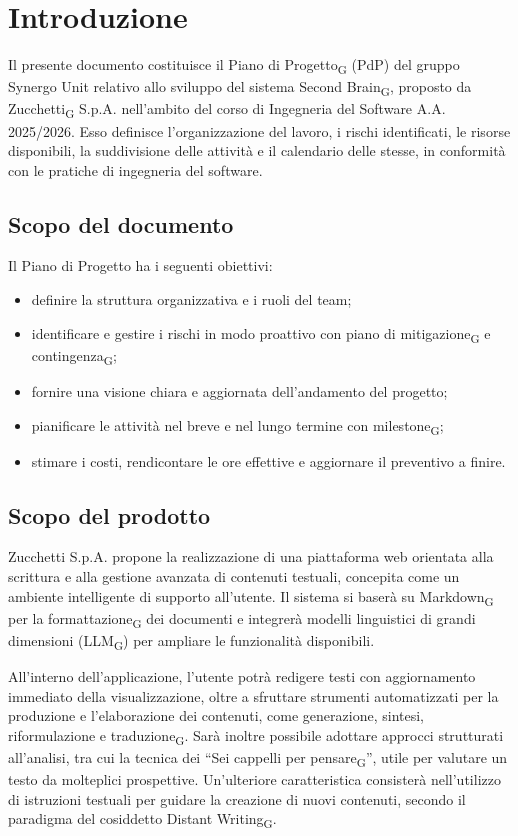 \section{Introduzione}
Il presente documento costituisce il Piano di Progetto\textsubscript{G} (PdP) del gruppo Synergo Unit relativo allo sviluppo del sistema Second Brain\textsubscript{G}, proposto da Zucchetti\textsubscript{G} S.p.A. nell'ambito del corso di Ingegneria del Software A.A. 2025/2026. Esso definisce l'organizzazione del lavoro, i rischi identificati, le risorse disponibili, la suddivisione delle attività e il calendario delle stesse, in conformità con le pratiche di ingegneria del software.

\subsection{Scopo del documento}
Il Piano di Progetto ha i seguenti obiettivi:
\begin{itemize}
    \item definire la struttura organizzativa e i ruoli del team;
    \item identificare e gestire i rischi in modo proattivo con piano di mitigazione\textsubscript{G} e contingenza\textsubscript{G};
    \item fornire una visione chiara e aggiornata dell'andamento del progetto;
    \item pianificare le attività nel breve e nel lungo termine con milestone\textsubscript{G};
    \item stimare i costi, rendicontare le ore effettive e aggiornare il preventivo a finire.
\end{itemize}

\subsection{Scopo del prodotto}
Zucchetti S.p.A. propone la realizzazione di una piattaforma web orientata alla scrittura e alla gestione avanzata di contenuti testuali, concepita come un ambiente intelligente di supporto all’utente. Il sistema si baserà su Markdown\textsubscript{G} per la formattazione\textsubscript{G} dei documenti e integrerà modelli linguistici di grandi dimensioni (LLM\textsubscript{G}) per ampliare le funzionalità disponibili.

All’interno dell’applicazione, l’utente potrà redigere testi con aggiornamento immediato della visualizzazione, oltre a sfruttare strumenti automatizzati per la produzione e l’elaborazione dei contenuti, come generazione, sintesi, riformulazione e traduzione\textsubscript{G}. Sarà inoltre possibile adottare approcci strutturati all’analisi, tra cui la tecnica dei “Sei cappelli per pensare\textsubscript{G}”, utile per valutare un testo da molteplici prospettive. Un’ulteriore caratteristica consisterà nell’utilizzo di istruzioni testuali per guidare la creazione di nuovi contenuti, secondo il paradigma del cosiddetto Distant Writing\textsubscript{G}.

